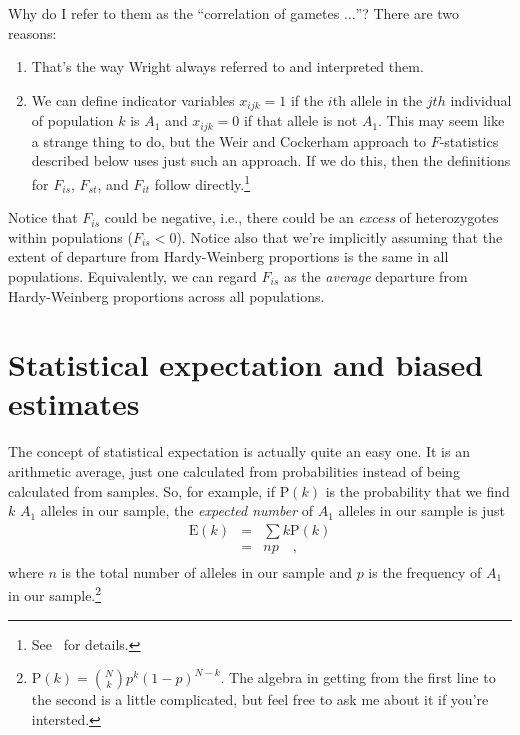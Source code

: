 \documentclass[12pt]{article}
\begin{document}
Why do I refer to them as the ``correlation of gametes $\dots$''?
There are two reasons:

\begin{enumerate}

\item That's the way Wright always referred to and interpreted them.

\item We can define indicator variables $x_{ijk} = 1$ if the $i$th
  allele in the $jth$ individual of population $k$ is $A_1$ and
  $x_{ijk} = 0$ if that allele is not $A_1$. This may seem like a
  strange thing to do, but the Weir and Cockerham approach to
  $F$-statistics described below uses just such an approach. If we do
  this, then the definitions for $F_{is}$, $F_{st}$, and $F_{it}$
  follow directly.\footnote{See~\cite{Weir-1996} for details.}

\end{enumerate}

Notice that $F_{is}$ could be negative, i.e., there could be an {\it
  excess\/} of heterozygotes within populations ($F_{is} < 0$). Notice
also that we're implicitly assuming that the extent of departure from
Hardy-Weinberg proportions is the same in all
populations. Equivalently, we can regard $F_{is}$ as the {\it
  average\/} departure from Hardy-Weinberg proportions across all
populations.

\section*{Statistical expectation and biased
  estimates}

The concept of statistical expectation is actually quite an easy
one. It is an arithmetic average, just one calculated from
probabilities instead of being calculated from samples. So, for
example, if $\mbox{P}(k)$ is the probability that we find $k$ $A_1$ alleles
in our sample, the {\it expected number\/} of $A_1$ alleles in
our sample is just
\begin{eqnarray*}
\mbox{E}(k) &=& \sum k \mbox{P}(k) \\
     &=& n p \quad , \\
\end{eqnarray*}
where $n$ is the total number of alleles in our sample and $p$ is the
frequency of $A_1$ in our sample.\footnote{$\mbox{P}(k) = {N
  \choose k}p^k(1-p)^{N-k}$. The algebra in getting from the first
  line to the second is a little complicated, but feel free to ask me
  about it if you're intersted.}
\end{document}
